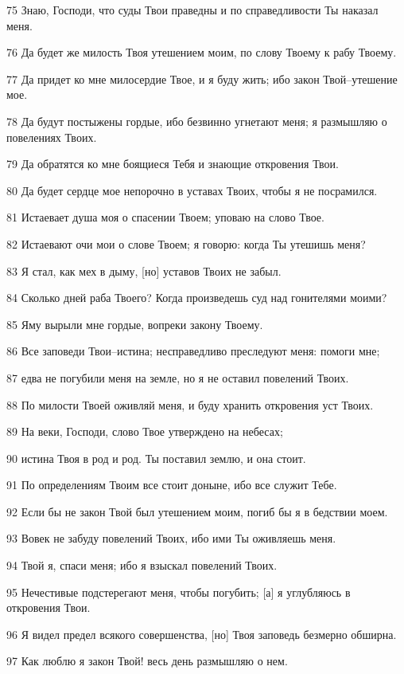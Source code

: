 \par 75 Знаю, Господи, что суды Твои праведны и по справедливости Ты наказал меня.
\par 76 Да будет же милость Твоя утешением моим, по слову Твоему к рабу Твоему.
\par 77 Да придет ко мне милосердие Твое, и я буду жить; ибо закон Твой--утешение мое.
\par 78 Да будут постыжены гордые, ибо безвинно угнетают меня; я размышляю о повелениях Твоих.
\par 79 Да обратятся ко мне боящиеся Тебя и знающие откровения Твои.
\par 80 Да будет сердце мое непорочно в уставах Твоих, чтобы я не посрамился.
\par 81 Истаевает душа моя о спасении Твоем; уповаю на слово Твое.
\par 82 Истаевают очи мои о слове Твоем; я говорю: когда Ты утешишь меня?
\par 83 Я стал, как мех в дыму, [но] уставов Твоих не забыл.
\par 84 Сколько дней раба Твоего? Когда произведешь суд над гонителями моими?
\par 85 Яму вырыли мне гордые, вопреки закону Твоему.
\par 86 Все заповеди Твои--истина; несправедливо преследуют меня: помоги мне;
\par 87 едва не погубили меня на земле, но я не оставил повелений Твоих.
\par 88 По милости Твоей оживляй меня, и буду хранить откровения уст Твоих.
\par 89 На веки, Господи, слово Твое утверждено на небесах;
\par 90 истина Твоя в род и род. Ты поставил землю, и она стоит.
\par 91 По определениям Твоим все стоит доныне, ибо все служит Тебе.
\par 92 Если бы не закон Твой был утешением моим, погиб бы я в бедствии моем.
\par 93 Вовек не забуду повелений Твоих, ибо ими Ты оживляешь меня.
\par 94 Твой я, спаси меня; ибо я взыскал повелений Твоих.
\par 95 Нечестивые подстерегают меня, чтобы погубить; [а] я углубляюсь в откровения Твои.
\par 96 Я видел предел всякого совершенства, [но] Твоя заповедь безмерно обширна.
\par 97 Как люблю я закон Твой! весь день размышляю о нем.
